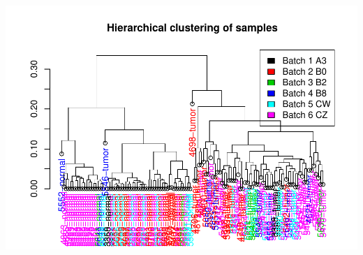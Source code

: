 \documentclass[]{article}
\begin{document}
\includegraphics{IEO_project_files/figure-latex/Hierarchical clustering according to batch effect-1.pdf}
\end{document}
